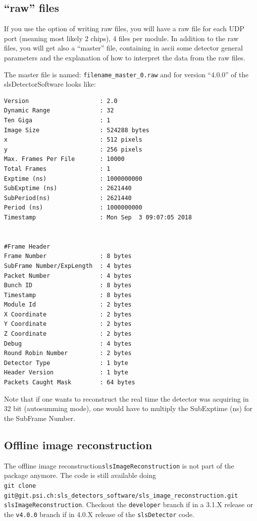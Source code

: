 \documentclass{article}
\begin{document}
\subsection{``raw'' files}
If you use the option of writing raw files, you will have a raw file for each UDP port (meaning most likely 2 chips), 4 files per module. In addition to the raw files, you will get also a ``master'' file, containing in ascii some detector general parameters and the explanation of how to interpret the data from the raw files.
   
The master file is named: {\tt{filename\_master\_0.raw}} and for version ``4.0.0'' of the slsDetectorSoftware looks like:
 
\begin{verbatim}
Version                    : 2.0
Dynamic Range              : 32
Ten Giga                   : 1
Image Size                 : 524288 bytes
x                          : 512 pixels
y                          : 256 pixels
Max. Frames Per File       : 10000
Total Frames               : 1
Exptime (ns)               : 1000000000
SubExptime (ns)            : 2621440
SubPeriod(ns)              : 2621440
Period (ns)                : 1000000000
Timestamp                  : Mon Sep  3 09:07:05 2018


#Frame Header
Frame Number               : 8 bytes
SubFrame Number/ExpLength  : 4 bytes
Packet Number              : 4 bytes
Bunch ID                   : 8 bytes
Timestamp                  : 8 bytes
Module Id                  : 2 bytes
X Coordinate               : 2 bytes
Y Coordinate               : 2 bytes
Z Coordinate               : 2 bytes
Debug                      : 4 bytes
Round Robin Number         : 2 bytes
Detector Type              : 1 byte
Header Version             : 1 byte
Packets Caught Mask        : 64 bytes
\end{verbatim}

Note that if one wants to  reconstruct the real time the detector was acquiring in 32 bit (autosumming mode), one would have to multiply the SubExptime (ns) for the SubFrame Number. 

\subsection{Offline image reconstruction}
The offline image reconstruction{\tt{slsImageReconstruction}} is not part of the package anymore. The code is still available doing \\
{\tt{git clone git@git.psi.ch:sls\_detectors\_software/sls\_image\_reconstruction.git slsImageReconstruction}}.
Checkout the {\tt{developer}} branch if in a 3.1.X release or the {\tt{v4.0.0}} branch if in 4.0.X release of the {\tt{slsDetector}} code.
\end{document}
